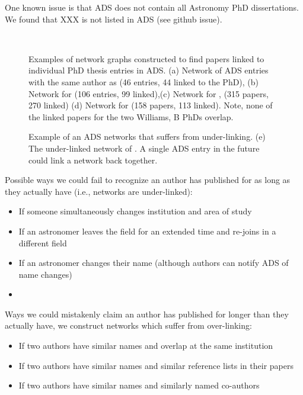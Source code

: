 \documentclass{emulateapj}
\begin{document}
One known issue is that ADS does not contain all Astronomy PhD dissertations. We found that XXX is not listed in ADS (see github issue).


\begin{figure*}
  \\
        \caption{Examples of network graphs constructed to find papers linked to individual PhD thesis entries in ADS.   (a) Network of ADS entries with the same author as \citet{Yoachim07} (46 entries, 44 linked to the PhD), (b) Network for \citet{Bellm2011} (106 entries, 99 linked),(c) Network for \citet{Williams02}, (315 papers, 270 linked) (d) Network for \citet{Williams11} (158 papers, 113 linked).  Note, none of the linked papers for the two Williams, B PhDs overlap. \label{fig:example_networks}}
\end{figure*}

\begin{figure}
  \caption{Example of an ADS networks that suffers from under-linking.  (e) The under-linked network of \citet{Capelo12}.  A single ADS entry in the future could link a network back together.}
\end{figure}


Possible ways we could fail to recognize an author has published for as long as they actually have (i.e., networks are under-linked):
\begin{itemize}
\item{If someone simultaneously changes institution and area of study}
  \item{If an astronomer leaves the field for an extended time and re-joins in a different field}
\item{If an astronomer changes their name (although authors can notify ADS of name changes)}
  \item{}
\end{itemize}

Ways we could mistakenly claim an author has published for longer than they actually have, we construct networks which suffer from over-linking:
\begin{itemize}
\item{If two authors have similar names and overlap at the same institution}
\item{If two authors have similar names and similar reference lists in their papers}
  \item{If two authors have similar names and similarly named co-authors}
\end{itemize}
\end{document}
